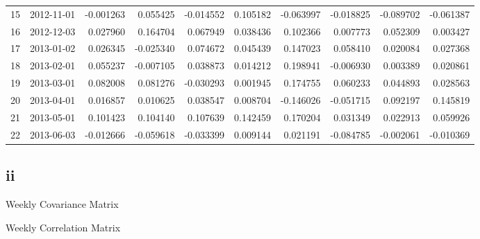 \documentclass{article}
\begin{document}
{\begin{tabular}{llrrrrrrrr}
        15 & 2012-11-01 & -0.001263 & 0.055425  & -0.014552 & 0.105182  & -0.063997 & -0.018825 & -0.089702 & -0.061387 \\
        16 & 2012-12-03 & 0.027960  & 0.164704  & 0.067949  & 0.038436  & 0.102366  & 0.007773  & 0.052309  & 0.003427  \\
        17 & 2013-01-02 & 0.026345  & -0.025340 & 0.074672  & 0.045439  & 0.147023  & 0.058410  & 0.020084  & 0.027368  \\
        18 & 2013-02-01 & 0.055237  & -0.007105 & 0.038873  & 0.014212  & 0.198941  & -0.006930 & 0.003389  & 0.020861  \\
        19 & 2013-03-01 & 0.082008  & 0.081276  & -0.030293 & 0.001945  & 0.174755  & 0.060233  & 0.044893  & 0.028563  \\
        20 & 2013-04-01 & 0.016857  & 0.010625  & 0.038547  & 0.008704  & -0.146026 & -0.051715 & 0.092197  & 0.145819  \\
        21 & 2013-05-01 & 0.101423  & 0.104140  & 0.107639  & 0.142459  & 0.170204  & 0.031349  & 0.022913  & 0.059926  \\
        22 & 2013-06-03 & -0.012666 & -0.059618 & -0.033399 & 0.009144  & 0.021191  & -0.084785 & -0.002061 & -0.010369 \\
        \bottomrule
    \end{tabular}


}
\subsection*{ii}
Weekly Covariance Matrix

Weekly Correlation Matrix
\end{document}
